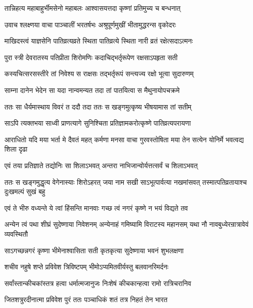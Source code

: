 \twolineshloka
{तान्निहत्य महाबाहुर्भीमसेनो महाबलः}
{आश्वासयत्तदा कृष्णां प्रतिमुच्य च बन्धनात्}


\twolineshloka
{उवाच श्लक्ष्णया वाचा पाञ्चालीं भरतर्षभः}
{अश्रुपूर्णमुखीं भीतामुद्धरन्स वृकोदरः}


\twolineshloka
{माखिदस्त्वं याज्ञसेनि पातिव्रत्यव्रते स्थिता}
{पातिव्रत्ये स्थिता नारी व्रतं रक्षेत्सदाऽत्मनः}


\twolineshloka
{पुरा स्त्री देवरातस्य पतिप्रीता शिरोमणिः}
{कदाचिद्भर्तृरूपेण रक्षसाऽपहृता सती}


\twolineshloka
{कस्यचित्सरसस्तीरे तां निवेश्य स राक्षसः}
{तद्भर्तृरूपं सन्त्यज्य रक्षो भूत्वा सुदारुणम्}


\twolineshloka
{साम्ना दानेन भेदेन सा यदा नान्वमन्यत}
{तदा तां पातयित्वा स मैथुनायोपचक्रमे}


\twolineshloka
{ततः सा धैर्यमास्थाय विवरं त ददौ तदा}
{ततः स खङ्गमुत्कृष्य भीषयामास तां सतीम्}


\twolineshloka
{साऽपि त्यक्तभया साध्वी प्राणत्यागे सुनिश्चिता}
{प्रतिज्ञामकरोत्कृष्णे पातिव्रत्यपरायणा}


\threelineshloka
{आराधितो यदि मया भर्ता मे दैवतं महत्}
{कर्मणा मनसा वाचा गुरवस्तोषिता मया}
{तेन सत्येन योनिर्मे भवत्वद्य शिला दृढा}


\twolineshloka
{एवं तया प्रतिज्ञाते तद्योनिः सा शिलाऽभवत्}
{अन्तरा नाभिजान्वोर्यत्तत्सर्वं च शिलाऽभवत्}


\onelineshloka
{ततः स खङ्गमुद्धृत्य वेगेनास्याः शिरोऽहरत्}
\twolineshloka
{जया नाम सखी साऽभूत्पार्वत्या नखमांसवत्}
{तस्मात्पतिव्रतायाश्च दुःखमल्पं सुखं बहु}


\twolineshloka
{एवं ते भीरु वध्यन्ते ये त्वां हिंसन्ति मानवाः}
{गच्छ त्वं नगरं कृष्णे न भयं विद्यते तव}


\threelineshloka
{अन्येन त्वं पथा शीघ्रं सुदेष्णाया निवेशनम्}
{अन्येनाहं गमिष्यामि विराटस्य महानसम्}
{यथा नौ नावबुध्येरन्रात्रावेवं व्यवस्थितौ}



\twolineshloka
{साऽगच्छन्नगरं कृष्णा भीमेनाश्वासिता सती}
{कृतकृत्या सुदेष्णाया भवनं शुभलक्षणा}


\twolineshloka
{शचीव नहुषे शप्ते प्रविवेश त्रिविष्टपम्}
{भीमोऽप्यमितवीर्यस्तु बलवानरिमर्दनः}


\twolineshloka
{सर्वांस्तान्कीचकांस्तत्र हत्वा धर्मात्मजानुजः}
{निःशेषं कीचकान्हत्वा रामो रात्रिचरानिव}


\twolineshloka
{जितशत्रुरदीनात्मा प्रविवेश पुरं ततः}
{पञ्चाधिकं शतं तत्र निहतं तेन भारत}


